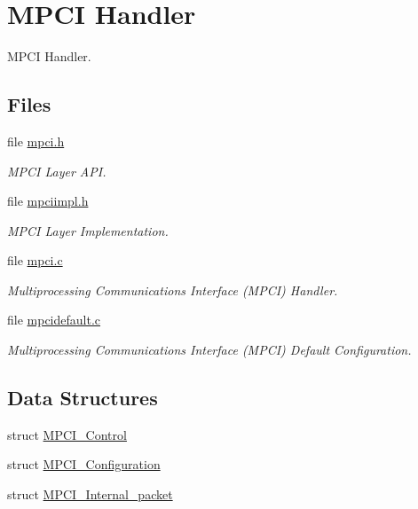\hypertarget{group__RTEMSScoreMPCI}{}\section{M\+P\+CI Handler}
\label{group__RTEMSScoreMPCI}


M\+P\+CI Handler.  


\subsection*{Files}
\begin{DoxyCompactItemize}
\item 
file \mbox{\hyperlink{cpukit_2include_2rtems_2score_2mpci_8h}{mpci.\+h}}
\begin{DoxyCompactList}\small\item\em M\+P\+CI Layer A\+PI. \end{DoxyCompactList}\item 
file \mbox{\hyperlink{mpciimpl_8h}{mpciimpl.\+h}}
\begin{DoxyCompactList}\small\item\em M\+P\+CI Layer Implementation. \end{DoxyCompactList}\item 
file \mbox{\hyperlink{mpci_8c}{mpci.\+c}}
\begin{DoxyCompactList}\small\item\em Multiprocessing Communications Interface (M\+P\+CI) Handler. \end{DoxyCompactList}\item 
file \mbox{\hyperlink{mpcidefault_8c}{mpcidefault.\+c}}
\begin{DoxyCompactList}\small\item\em Multiprocessing Communications Interface (M\+P\+CI) Default Configuration. \end{DoxyCompactList}\end{DoxyCompactItemize}
\subsection*{Data Structures}
\begin{DoxyCompactItemize}
\item 
struct \mbox{\hyperlink{structMPCI__Control}{M\+P\+C\+I\+\_\+\+Control}}
\item 
struct \mbox{\hyperlink{structMPCI__Configuration}{M\+P\+C\+I\+\_\+\+Configuration}}
\item 
struct \mbox{\hyperlink{structMPCI__Internal__packet}{M\+P\+C\+I\+\_\+\+Internal\+\_\+packet}}
\end{DoxyCompactItemize}
